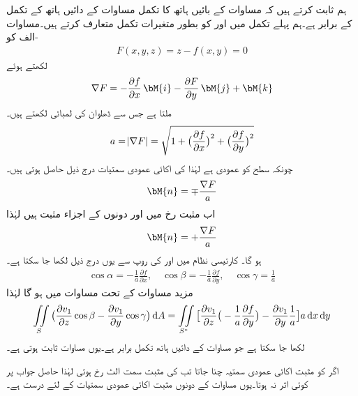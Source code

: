 ہم ثابت کرتے ہیں کہ مساوات  کے بائیں ہاتھ کا تکمل مساوات  کے دائیں ہاتھ کے تکمل کے برابر ہے۔ہم پہلے تکمل میں  اور  کو بطور متغیرات تکمل متعارف کرتے ہیں۔مساوات -الف کو
\begin{align*}
F(x,y,z)=z-f(x,y)=0
\end{align*}
لکھتے ہوئے
\begin{align*}
\nabla F=-\frac{\partial f}{\partial x}\,\bM{i}-\frac{\partial F}{\partial y}\,\bM{j}+\bM{k}
\end{align*}
ملتا ہے جس سے ڈھلوان  کی لمبائی  لکھتے ہیں۔
\begin{align*}
a=\abs{\nabla F}=\sqrt{1+\big(\frac{\partial f}{\partial x}\big)^2+\big(\frac{\partial f}{\partial y}\big)^2}
\end{align*}
چونکہ  سطح  کو عمودی ہے لہٰذا   کی اکائی عمودی سمتیات  درج ذیل حاصل ہوتی ہیں۔
\begin{align*}
\bM{n}=\mp \frac{\nabla F}{a}
\end{align*}
اب مثبت  رخ میں  اور  دونوں کے اجزاء مثبت ہیں لہٰذا
\begin{align*}
\bM{n}=+ \frac{\nabla F}{a}
\end{align*}
ہو گا۔  کارتیسی نظام میں  اور  کی روپ سے یوں درج ذیل لکھا جا سکتا ہے۔
\begin{align*}
\cos \alpha=-\frac{1}{a}\frac{\partial f}{\partial x},\quad  \cos \beta=-\frac{1}{a}\frac{\partial f}{\partial y},\quad \cos \gamma=\frac{1}{a}
\end{align*}
مزید مساوات  کے تحت مساوات  میں  ہو گا لہٰذا
\begin{align*}
\iint\limits_S \big(\frac{\partial v_1}{\partial z}\cos \beta-\frac{\partial v_1}{\partial y}\cos \gamma\big)\dif A=\iint\limits_{S^*}\big[\frac{\partial v_1}{\partial z}\big(-\frac{1}{a}\frac{\partial f}{\partial y}\big)-\frac{\partial v_1}{\partial y}\frac{1}{a}\big]a\dif x\dif y
\end{align*}
لکھا جا سکتا ہے جو مساوات  کے دائیں ہاتھ تکمل برابر ہے۔یوں مساوات  ثابت ہوتی ہے۔

اگر  کو مثبت اکائی عمودی سمتیہ چنا جاتا تب  کی مثبت سمت الٹ رخ ہوتی لہٰذا حاصل جواب پر کوئی اثر نہ ہوتا۔یوں مساوات   کے دونوں مثبت اکائی عمودی سمتیات کے لئے درست ہے۔

